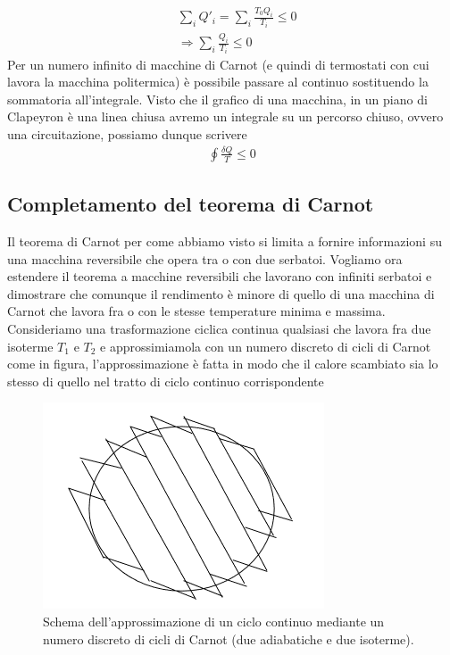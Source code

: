 \documentclass[10pt,a4paper]{article}
\begin{document}
\begin{align*}
	&\sum_i Q'_i = \sum_i\frac{T_0 Q_i}{T_i}\leq 0\\
	&\Rightarrow \sum_i \frac{Q_i}{T_i}\leq 0
\end{align*}
Per un numero infinito di macchine di Carnot (e quindi di termostati con cui lavora la macchina politermica) è possibile passare al continuo sostituendo la sommatoria all'integrale. Visto che il grafico di una macchina, in un piano di Clapeyron è una linea chiusa avremo un integrale su un percorso chiuso, ovvero una circuitazione, possiamo dunque scrivere
\begin{align*}
	\oint \frac{\delta Q}{T}\leq 0
\end{align*}
\subsection{Completamento del teorema di Carnot}
Il teorema di Carnot per come abbiamo visto si limita a fornire informazioni su una macchina reversibile che opera tra o con due serbatoi. Vogliamo ora estendere il teorema a macchine reversibili che lavorano con infiniti serbatoi e dimostrare che comunque il rendimento è minore di quello di una macchina di Carnot che lavora fra o con le stesse temperature minima e massima.\\
Consideriamo una trasformazione ciclica continua qualsiasi che lavora fra due isoterme \(T_1\) e \(T_2\) e approssimiamola con un numero discreto di cicli di Carnot come in figura, l'approssimazione è fatta in modo che il calore scambiato sia lo stesso di quello nel tratto di ciclo continuo corrispondente
\begin{figure}[h!]
	\centering
	\includegraphics[width=0.6\linewidth]{../images/ciclo_continuo}
	\caption{Schema dell'approssimazione di un ciclo continuo mediante un numero discreto di cicli di Carnot (due adiabatiche e due isoterme).}
	\label{fig:ciclocontinuo}
\end{figure}
\end{document}
